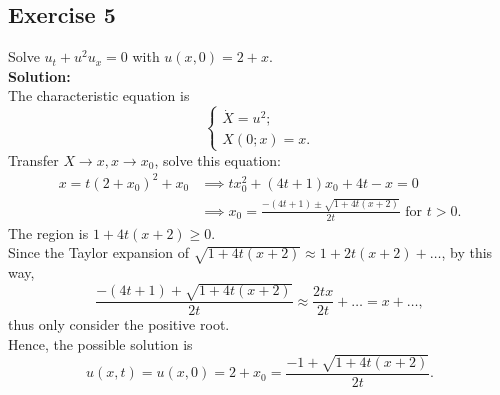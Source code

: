 \documentclass[12pt]{article}%
\begin{document}
\subsection*{Exercise 5}
Solve $u_{t}+u^2u_{x}=0$ with $u(x,0)=2+x$.\\
\textbf{Solution:}\\
The characteristic equation is \begin{equation*}
    \begin{cases}
        \dot{X}=u^2;
        \\
        X(0;x)=x.
    \end{cases}
\end{equation*}
Transfer $X\to x, x\to x_{0}$, solve this equation:
\begin{equation*}
    \begin{split}
        x=t(2+x_{0})^2+x_{0} &\implies tx^2_{0}+(4t+1)x_{0}+4t-x=0\\
        &\implies x_{0}=\frac{-(4t+1)\pm\sqrt{1+4t(x+2)}}{2t} \text{ for } t > 0 .
    \end{split}
\end{equation*}
The region is $ 1+4t(x+2)\ge 0$.\\
Since the Taylor expansion of $ \sqrt{1+4t(x+2)}\approx1+2t(x+2)+\dots$, by this way, \[\frac{-(4t+1)+\sqrt{1+4t(x+2)}}{2t}\approx\frac{2tx}{2t}+\dots=x+\dots,\]
thus only consider the positive root.\\
Hence, the possible solution is \[u(x,t)=u(x,0)=2+x_{0}=\frac{-1+\sqrt{1+4t(x+2)}}{2t}.\]
\end{document}
